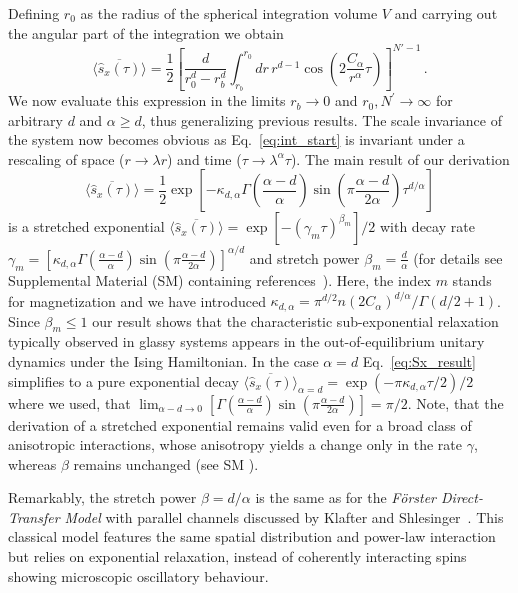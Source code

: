\documentclass[aps,twocolumn,
superscriptaddress,
footinbib,
prl]{revtex4-1}
\begin{document}
Defining $r_0$ as the radius of the spherical integration volume $V$ and carrying out the angular part of the integration we obtain
\begin{equation}
\label{eq:int_start}
    \overline{\langle \hat{s}_x(\tau) \rangle}  = \frac{1}{2}\left[\frac{d}{r_0^d - r_b^d} \int_{r_b}^{r_0} dr\, r^{d-1} \cos\left(2\frac{ C_\alpha}{r^{\alpha}} \tau\right)\right]^{N'-1} \,.
\end{equation}
We now evaluate this expression in the limits $r_b\to 0$ and $r_0, N^\prime\to\infty$ for arbitrary $d$ and $\alpha\geq d$, thus generalizing previous results. The scale invariance of the system now becomes obvious as Eq.~\eqref{eq:int_start} is invariant under a rescaling of space ($r\rightarrow \lambda r$) and time ($\tau\rightarrow \lambda^\alpha \tau$).
The main result of our derivation
\begin{equation}
\label{eq:Sx_result}
    \overline{\langle \hat{s}_x(\tau) \rangle} = \frac{1}{2} \exp\left[-\kappa_{d,\alpha} \Gamma\left(\frac{\alpha -d}{\alpha}\right) \sin (\pi \frac{\alpha -d }{2\alpha })\tau^{d/\alpha} \right]
\end{equation}
is a stretched exponential $\overline{\langle \hat{s}_x(\tau) \rangle} = \exp\left[-(\gamma_m \tau )^{\beta_m}\right]/2$
with decay rate $\gamma_m  = \left[\kappa_{d,\alpha} \Gamma\left(\frac{\alpha -d}{\alpha}\right) \sin (\pi \frac{\alpha -d }{2\alpha }) \right]^{\alpha/d}$
and stretch power $\beta_m = \frac{d}{\alpha}$ (for details see Supplemental Material (SM) \cite{SM} containing references~\cite{mathar2012series}). Here, the index $m$ stands for magnetization and we have introduced $\kappa_{d,\alpha} = \pi ^{d/2} n  (2 C_\alpha)^{d/\alpha}/\Gamma(d/2 +1)  $.
Since $\beta_m\leq 1$ our result shows that the characteristic sub-exponential relaxation typically observed in glassy systems appears in the out-of-equilibrium unitary dynamics under the Ising Hamiltonian.
In the case $\alpha = d$ Eq.~\eqref{eq:Sx_result} simplifies to a pure exponential decay $\overline{\langle \hat{s}_x(\tau) \rangle}_{\alpha = d} = \exp\left(- \pi \kappa_{d,\alpha}  \tau/2 \right)/2$
where we used, that $\lim_{\alpha -d  \to 0}  \left[\Gamma\left(\frac{\alpha -d}{\alpha}\right) \sin \left(\pi \frac{\alpha -d }{2\alpha }\right)\right] = \pi / 2$. Note, that the derivation of a stretched exponential remains valid even for a broad class of anisotropic interactions, whose anisotropy yields a change only in the rate $\gamma$, whereas $\beta$ remains unchanged (see SM \cite{SM}).

Remarkably, the stretch power $\beta = d/\alpha$ is the same as for the \textit{Förster Direct-Transfer Model} with parallel channels discussed by Klafter and Shlesinger~\cite{Klafter1986OnSystems}. This classical model features the same spatial distribution and power-law interaction but relies on exponential relaxation, instead of coherently interacting spins showing microscopic oscillatory behaviour. 
\end{document}
